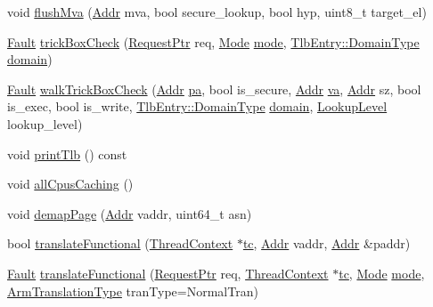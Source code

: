\begin{DoxyCompactItemize}
void \hyperlink{classArmISA_1_1TLB_a9ea15078537697a5208dea8e912d7a08}{flushMva} (\hyperlink{classm5_1_1params_1_1Addr}{Addr} mva, bool secure\_\-lookup, bool hyp, uint8\_\-t target\_\-el)
\item 
\hyperlink{classRefCountingPtr}{Fault} \hyperlink{classArmISA_1_1TLB_aa14d4829f5c7bce966547df0babb7487}{trickBoxCheck} (\hyperlink{classRequest}{RequestPtr} req, \hyperlink{classBaseTLB_a46c8a310cf4c094f8c80e1cb8dc1f911}{Mode} \hyperlink{namespaceArmISA_a5f3b9b97eb2dfa29d33e74878455f90d}{mode}, \hyperlink{structArmISA_1_1TlbEntry_a0595b41cfb7d03f18438f9c355a3469d}{TlbEntry::DomainType} \hyperlink{namespaceArmISA_ad0cc3566b56b49851f0996cbbe5000cf}{domain})
\item 
\hyperlink{classRefCountingPtr}{Fault} \hyperlink{classArmISA_1_1TLB_a19bf31f32ec6125d85acc1feeee28e47}{walkTrickBoxCheck} (\hyperlink{classm5_1_1params_1_1Addr}{Addr} \hyperlink{namespaceArmISA_aec59a1cc2e7438586cdc39f4b30b0061}{pa}, bool is\_\-secure, \hyperlink{classm5_1_1params_1_1Addr}{Addr} \hyperlink{namespaceArmISA_a441099e13f407fadb6bcb0447107de87}{va}, \hyperlink{classm5_1_1params_1_1Addr}{Addr} sz, bool is\_\-exec, bool is\_\-write, \hyperlink{structArmISA_1_1TlbEntry_a0595b41cfb7d03f18438f9c355a3469d}{TlbEntry::DomainType} \hyperlink{namespaceArmISA_ad0cc3566b56b49851f0996cbbe5000cf}{domain}, \hyperlink{namespaceArmISA_aefa4213b348e38ee69f2a6109563a7bd}{LookupLevel} lookup\_\-level)
\item 
void \hyperlink{classArmISA_1_1TLB_a48b5486ebf7c83e7c81025a032312ca6}{printTlb} () const 
\item 
void \hyperlink{classArmISA_1_1TLB_a5fd1cb3fb8887f4bd6c1f982a23cc026}{allCpusCaching} ()
\item 
void \hyperlink{classArmISA_1_1TLB_a2d698ff909513b48a1263f8a5440e067}{demapPage} (\hyperlink{classm5_1_1params_1_1Addr}{Addr} vaddr, uint64\_\-t asn)
\item 
bool \hyperlink{classArmISA_1_1TLB_a4871909ce80dc11f7ddffcd28214262e}{translateFunctional} (\hyperlink{classThreadContext}{ThreadContext} $\ast$\hyperlink{namespaceArmISA_a5aff829af55e65b802d83dfcef4e9dd0}{tc}, \hyperlink{classm5_1_1params_1_1Addr}{Addr} vaddr, \hyperlink{classm5_1_1params_1_1Addr}{Addr} \&paddr)
\item 
\hyperlink{classRefCountingPtr}{Fault} \hyperlink{classArmISA_1_1TLB_ab1be1538ff47c6977f901f22ba6150a0}{translateFunctional} (\hyperlink{classRequest}{RequestPtr} req, \hyperlink{classThreadContext}{ThreadContext} $\ast$\hyperlink{namespaceArmISA_a5aff829af55e65b802d83dfcef4e9dd0}{tc}, \hyperlink{classBaseTLB_a46c8a310cf4c094f8c80e1cb8dc1f911}{Mode} \hyperlink{namespaceArmISA_a5f3b9b97eb2dfa29d33e74878455f90d}{mode}, \hyperlink{classArmISA_1_1TLB_ad6f5d480df151d5bddeefc6271793f08}{ArmTranslationType} tranType=NormalTran)

\end{DoxyCompactItemize}
